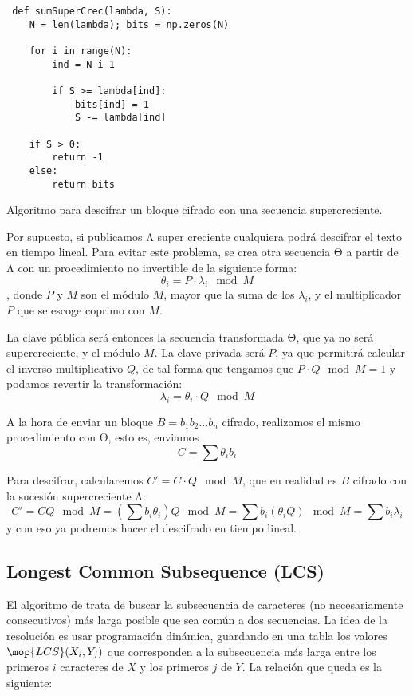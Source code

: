 \documentclass[palatino, nochap]{apuntes}
\begin{document}
\begin{listing}
\begin{verbatim}
 def sumSuperCrec(lambda, S):
    N = len(lambda); bits = np.zeros(N)

    for i in range(N):
        ind = N-i-1

        if S >= lambda[ind]:
			bits[ind] = 1
           	S -= lambda[ind]

    if S > 0:
    	return -1
	else:
		return bits
\end{verbatim}
\caption{Algoritmo para descifrar un bloque cifrado con una secuencia supercreciente.}
\label{lst:SumSuperCrec}
\end{listing}

Por supuesto, si publicamos Λ super creciente cualquiera podrá descifrar el texto en tiempo lineal. Para evitar este problema, se crea otra secuencia Θ a partir de Λ con un procedimiento no invertible de la siguiente forma: \[ θ_i = P · λ_i \mod M \], donde $P$ y $M$ son el módulo $M$, mayor que la suma de los $λ_i$, y el multiplicador $P$ que se escoge coprimo con $M$.

La clave pública será entonces la secuencia transformada Θ, que ya no será supercreciente, y el módulo $M$. La clave privada será $P$, ya que permitirá calcular el inverso multiplicativo $Q$, de tal forma que tengamos que $P·Q \mod M = 1$ y podamos revertir la transformación: \[ λ_i = θ_i · Q \mod M \]

A la hora de enviar un bloque $B = b_1b_2\dotsc b_n$ cifrado, realizamos el mismo procedimiento con Θ, esto es, enviamos \[ C = \sum θ_i b_i \]

Para descifrar, calcularemos $C' = C·Q \mod M$, que en realidad es $B$ cifrado con la sucesión supercreciente Λ: \[ C' = CQ \mod M = \left(\sum b_i θ_i\right) Q \mod M = \sum b_i (θ_i Q) \mod M = \sum b_i λ_i \] y con eso ya podremos hacer el descifrado en tiempo lineal.

\subsection{Longest Common Subsequence (LCS)}

El algoritmo de  trata de buscar la subsecuencia de caracteres (no necesariamente consecutivos) más larga posible que sea común a dos secuencias. La idea de la resolución es usar programación dinámica, guardando en una tabla los valores $\mop{LCS}(X_i, Y_j)$ que corresponden a la subsecuencia más larga entre los primeros $i$ caracteres de $X$ y los primeros $j$ de $Y$. La relación que queda es la siguiente:
\end{document}
